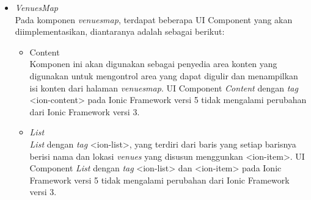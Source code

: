 \begin{itemize}
	\item \textit{VenuesMap}\\
	Pada komponen \textit{venues\textunderscore map}, terdapat beberapa UI Component yang akan diimplementasikan, diantaranya adalah sebagai berikut:
	\begin{itemize}
			\item Content \\
		Komponen ini akan digunakan sebagai penyedia area konten yang digunakan untuk mengontrol area yang dapat digulir dan menampilkan isi konten dari halaman \textit{venues\textunderscore map}. UI Component \textit{Content} dengan \textit{tag} <ion-content> pada Ionic Framework versi 5 tidak mengalami perubahan dari Ionic Framework versi 3.
			\item \textit{List} \\
		\textit{List} dengan \textit{tag} <ion-list>, yang terdiri dari baris yang setiap barisnya berisi nama dan lokasi \textit{venues} yang disusun menggunkan <ion-item>. UI Component \textit{List} dengan \textit{tag} <ion-list> dan <ion-item> pada Ionic Framework versi 5 tidak mengalami perubahan dari Ionic Framework versi 3.
		\end{itemize}
	
\end{itemize}

